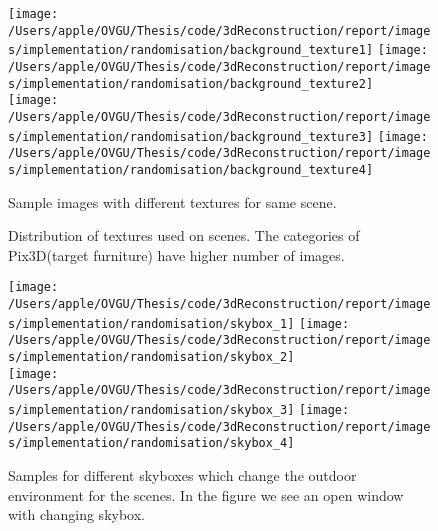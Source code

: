 \begin{figure}
    \centering
    \texttt{[image: /Users/apple/OVGU/Thesis/code/3dReconstruction/report/images/implementation/randomisation/background\_texture1]}
    \texttt{[image: /Users/apple/OVGU/Thesis/code/3dReconstruction/report/images/implementation/randomisation/background\_texture2]}\\
    \vspace{0.1cm}
    \texttt{[image: /Users/apple/OVGU/Thesis/code/3dReconstruction/report/images/implementation/randomisation/background\_texture3]}
    \texttt{[image: /Users/apple/OVGU/Thesis/code/3dReconstruction/report/images/implementation/randomisation/background\_texture4]}\\
    \caption{Sample images with different textures for same scene.}
    \label{fig:Texture Randomisation}
\end{figure}

\begin{figure}
    \centering
    \resizebox{0.9\textwidth}{10cm}{}
    \caption{Distribution of textures used on scenes. The categories of Pix3D(target furniture) have higher number of images.}
    \label{fig:Distribution of textures}
\end{figure}

\begin{figure}
    \centering
    \texttt{[image: /Users/apple/OVGU/Thesis/code/3dReconstruction/report/images/implementation/randomisation/skybox\_1]}
    \texttt{[image: /Users/apple/OVGU/Thesis/code/3dReconstruction/report/images/implementation/randomisation/skybox\_2]} \\
    \vspace{0.1cm}
    \texttt{[image: /Users/apple/OVGU/Thesis/code/3dReconstruction/report/images/implementation/randomisation/skybox\_3]}
    \texttt{[image: /Users/apple/OVGU/Thesis/code/3dReconstruction/report/images/implementation/randomisation/skybox\_4]}\\
    \caption{Samples for different skyboxes which change the outdoor environment for the scenes. In the figure we see an open window with changing skybox.}
    \label{fig:skybox samples}
\end{figure}




